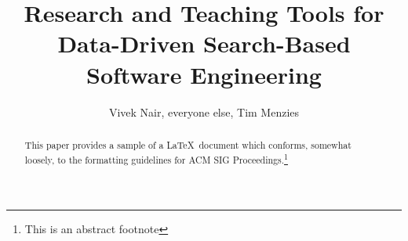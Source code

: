 \documentclass[table, xcdraw, sigconf,review, anonymous]{acmart}
\begin{document}
\title{Research and Teaching
Tools for Data-Driven Search-Based Software Engineering}

\author{Vivek Nair, everyone else, Tim Menzies}


\begin{abstract}
This paper provides a sample of a \LaTeX\ document which conforms,
somewhat loosely, to the formatting guidelines for
ACM SIG Proceedings.\footnote{This is an abstract footnote}
\end{abstract}

%
%





\maketitle
\end{document}

